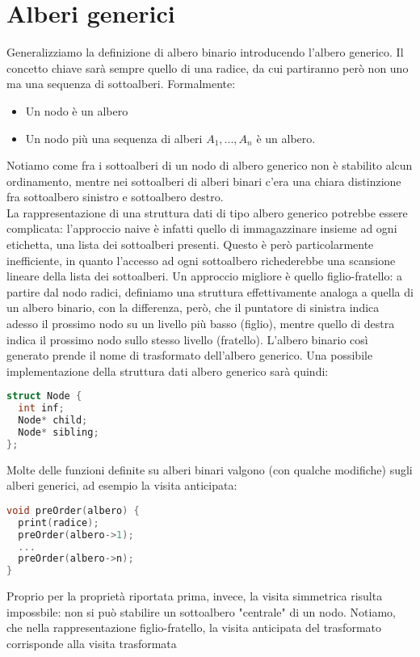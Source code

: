 \documentclass[a4paper,12pt]{article}
\begin{document}
\section{Alberi generici}
Generalizziamo la definizione di albero binario introducendo l'albero generico. Il concetto chiave sarà sempre quello
di una radice, da cui partiranno però non uno ma una sequenza di sottoalberi. Formalmente:
\begin{itemize}
  \item Un nodo è un albero
  \item Un nodo più una sequenza di alberi $A_1,...,A_n$ è un albero.
\end{itemize}
Notiamo come fra i sottoalberi di un nodo di albero generico non è stabilito alcun ordinamento, mentre nei sottoalberi
di alberi binari c'era una chiara distinzione fra sottoalbero sinistro e sottoalbero destro. \\
La rappresentazione di una struttura dati di tipo albero generico potrebbe essere complicata: l'approccio naive è infatti
quello di immagazzinare insieme ad ogni etichetta, una lista dei sottoalberi presenti. Questo è però particolarmente inefficiente,
in quanto l'accesso ad ogni sottoalbero richederebbe una scansione lineare della lista dei sottoalberi. Un approccio migliore è
quello figlio-fratello: a partire dal nodo radici, definiamo una struttura effettivamente analoga a quella di un albero binario,
con la differenza, però, che il puntatore di sinistra indica adesso il prossimo nodo su un livello più basso (figlio), mentre quello di destra
indica il prossimo nodo sullo stesso livello (fratello). L'albero binario così generato prende il nome di trasformato dell'albero generico.
Una possibile implementazione della struttura dati albero generico sarà quindi:
\begin{lstlisting}[language=C++]
struct Node {
  int inf;
  Node* child;
  Node* sibling;
};
\end{lstlisting}
Molte delle funzioni
definite su alberi binari valgono (con qualche modifiche) sugli alberi generici, ad esempio la visita anticipata:
\begin{lstlisting}[language=C++]
void preOrder(albero) {
  print(radice);
  preOrder(albero->1);
  ...
  preOrder(albero->n);
}
\end{lstlisting}
Proprio per la proprietà riportata prima, invece, la visita simmetrica risulta impossbile: non si può stabilire un sottoalbero
"centrale" di un nodo.
Notiamo, che nella rappresentazione figlio-fratello, la visita anticipata del trasformato corrisponde alla visita trasformata
\end{document}
